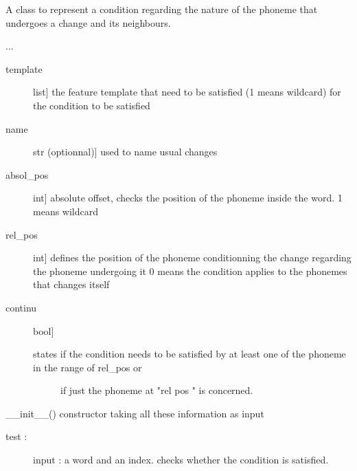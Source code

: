 \documentclass[letterpaper,10pt,english]{sphinxmanual}
\begin{document}

\begin{fulllineitems}
\label{\detokenize{index:Condition.P_condition}}
\sphinxAtStartPar
A class to represent a condition regarding the nature of the phoneme that undergoes a change 
and its neighbours.

\sphinxAtStartPar
...
\begin{description}
\item[{template}] \leavevmode{[}list{]}
\sphinxAtStartPar
the feature template that need to be satisfied (\sphinxhyphen{}1 means  wildcard) for the condition to be satisfied

\item[{name}] \leavevmode{[}str (optionnal){]}
\sphinxAtStartPar
used to name usual changes

\item[{absol\_pos}] \leavevmode{[}int{]}
\sphinxAtStartPar
absolute offset, checks the position of the phoneme inside the word.
\sphinxhyphen{}1 means wildcard

\item[{rel\_pos}] \leavevmode{[}int{]}
\sphinxAtStartPar
defines the position of the phoneme conditionning the change regarding the phoneme undergoing it
0 means the condition applies to the phonemes that changes itself

\item[{continu}] \leavevmode{[}bool{]}\begin{description}
\item[{states if the condition needs to be satisfied by at least one of the phoneme in the range of rel\_pos or }] \leavevmode
\sphinxAtStartPar
if just the phoneme at "rel pos " is concerned.

\end{description}

\end{description}

\sphinxAtStartPar
\_\_init\_\_() constructor taking all these information as input
\begin{description}
\item[{test :}] \leavevmode
\sphinxAtStartPar
input : a word and an index.
checks whether the condition is satisfied.


\end{description}
\end{fulllineitems}
\end{document}
